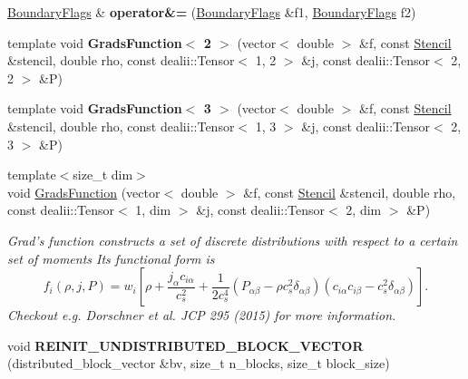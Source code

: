 \begin{DoxyCompactItemize}
\item 
\hypertarget{namespacenatrium_ad1710742f771c6817888a736a098d10b}{
\hyperlink{namespacenatrium_a93b2a3d564675413b9f6cc88c60f46af}{BoundaryFlags} \& {\bfseries operator\&=} (\hyperlink{namespacenatrium_a93b2a3d564675413b9f6cc88c60f46af}{BoundaryFlags} \&f1, \hyperlink{namespacenatrium_a93b2a3d564675413b9f6cc88c60f46af}{BoundaryFlags} f2)}
\label{namespacenatrium_ad1710742f771c6817888a736a098d10b}

\item 
\hypertarget{namespacenatrium_ab114b1ec26e472df5c5071f4377e2339}{
template void {\bfseries GradsFunction$<$ 2 $>$} (vector$<$ double $>$ \&f, const \hyperlink{classnatrium_1_1Stencil}{Stencil} \&stencil, double rho, const dealii::Tensor$<$ 1, 2 $>$ \&j, const dealii::Tensor$<$ 2, 2 $>$ \&P)}
\label{namespacenatrium_ab114b1ec26e472df5c5071f4377e2339}

\item 
\hypertarget{namespacenatrium_ac0b5270dcb4b0e4099644d9fae1a7d44}{
template void {\bfseries GradsFunction$<$ 3 $>$} (vector$<$ double $>$ \&f, const \hyperlink{classnatrium_1_1Stencil}{Stencil} \&stencil, double rho, const dealii::Tensor$<$ 1, 3 $>$ \&j, const dealii::Tensor$<$ 2, 3 $>$ \&P)}
\label{namespacenatrium_ac0b5270dcb4b0e4099644d9fae1a7d44}

\item 
\hypertarget{namespacenatrium_ad76c25c4de7488b1d117274f62d4f929}{
{\footnotesize template$<$size\_\-t dim$>$ }\\void \hyperlink{namespacenatrium_ad76c25c4de7488b1d117274f62d4f929}{GradsFunction} (vector$<$ double $>$ \&f, const \hyperlink{classnatrium_1_1Stencil}{Stencil} \&stencil, double rho, const dealii::Tensor$<$ 1, dim $>$ \&j, const dealii::Tensor$<$ 2, dim $>$ \&P)}
\label{namespacenatrium_ad76c25c4de7488b1d117274f62d4f929}

\begin{DoxyCompactList}\small\item\em Grad's function constructs a set of discrete distributions with respect to a certain set of moments Its functional form is \[ f_i(\rho, j, P) = w_i \left[ \rho + \frac{j_{\alpha} c_{i \alpha} }{c_s^2} + \frac{1}{2 c_s^4} \left( P_{\alpha \beta} - \rho c_s^2 \delta_{\alpha \beta} \right) \left( c_{i \alpha} c_{i \beta} - c_s^2 \delta_{\alpha \beta} \right) \right]. \] Checkout e.g. Dorschner et al. JCP 295 (2015) for more information. \item\end{DoxyCompactList}\item 
\hypertarget{namespacenatrium_a31c41694ea4808b3e801fd586bc10fef}{
void {\bfseries REINIT\_\-UNDISTRIBUTED\_\-BLOCK\_\-VECTOR} (distributed\_\-block\_\-vector \&bv, size\_\-t n\_\-blocks, size\_\-t block\_\-size)}
\label{namespacenatrium_a31c41694ea4808b3e801fd586bc10fef}


\end{DoxyCompactItemize}
